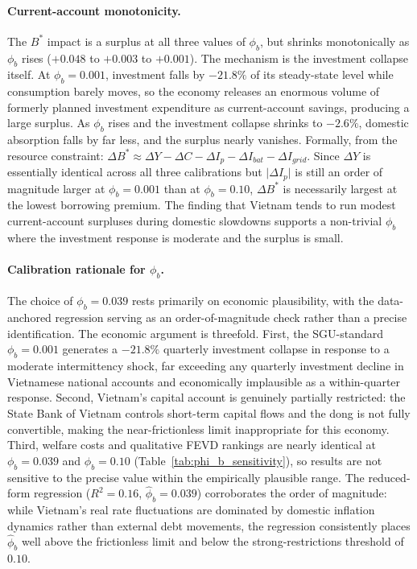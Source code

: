 \documentclass[12pt, a4paper]{article}
\begin{document}
	\paragraph{Current-account monotonicity.} The $B^*$ impact is a surplus at all three values of $\phi_b$, but shrinks monotonically as $\phi_b$ rises ($+0.048$ to $+0.003$ to $+0.001$). The mechanism is the investment collapse itself. At $\phi_b = 0.001$, investment falls by $-21.8\%$ of its steady-state level while consumption barely moves, so the economy releases an enormous volume of formerly planned investment expenditure as current-account savings, producing a large surplus. As $\phi_b$ rises and the investment collapse shrinks to $-2.6\%$, domestic absorption falls by far less, and the surplus nearly vanishes. Formally, from the resource constraint: $\Delta B^* \approx \Delta Y - \Delta C - \Delta I_p - \Delta I_{bat} - \Delta I_{grid}$. Since $\Delta Y$ is essentially identical across all three calibrations but $\lvert\Delta I_p\rvert$ is still an order of magnitude larger at $\phi_b = 0.001$ than at $\phi_b = 0.10$, $\Delta B^*$ is necessarily largest at the lowest borrowing premium. The finding that Vietnam tends to run modest current-account surpluses during domestic slowdowns \citep{worldbank2024} supports a non-trivial $\phi_b$ where the investment response is moderate and the surplus is small.

	\paragraph{Calibration rationale for $\phi_b$.} The choice of $\phi_b = 0.039$ rests primarily on economic plausibility, with the data-anchored regression serving as an order-of-magnitude check rather than a precise identification. The economic argument is threefold. First, the SGU-standard $\phi_b = 0.001$ generates a $-21.8\%$ quarterly investment collapse in response to a moderate intermittency shock, far exceeding any quarterly investment decline in Vietnamese national accounts \citep{gso2024} and economically implausible as a within-quarter response. Second, Vietnam's capital account is genuinely partially restricted: the State Bank of Vietnam controls short-term capital flows and the dong is not fully convertible, making the near-frictionless limit inappropriate for this economy. Third, welfare costs and qualitative FEVD rankings are nearly identical at $\phi_b = 0.039$ and $\phi_b = 0.10$ (Table~\ref{tab:phi_b_sensitivity}), so results are not sensitive to the precise value within the empirically plausible range. The reduced-form regression ($R^2 = 0.16$, $\hat{\phi}_b = 0.039$) corroborates the order of magnitude: while Vietnam's real rate fluctuations are dominated by domestic inflation dynamics rather than external debt movements, the regression consistently places $\hat{\phi}_b$ well above the frictionless limit and below the strong-restrictions threshold of $0.10$.
\end{document}
